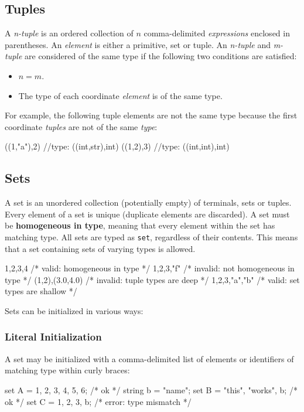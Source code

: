 \subsection{Tuples}
A \textit{n-tuple} is an ordered collection of $n$ comma-delimited \textit{expressions} enclosed in parentheses.  An 		\textit{element} is either a primitive, set or tuple.  An \textit{n-tuple} and \textit{m-tuple} are considered of the 			same type if the following two conditions are satisfied:
		\begin{itemize}
		\item $n = m$.
		\item The type of each coordinate \textit{element} is of the same type.
		\end{itemize}
	For example, the following tuple elements are not the same type because the first coordinate \textit{tuples} are not of the same \textit{type}:
	
\begin{code}
((1,"a"),2) //type: ((int,str),int)
((1,2),3) //type: ((int,int),int)
\end{code}
	
\subsection{Sets}
A set is an unordered collection (potentially empty) of terminals, sets or tuples.  Every element of a set is unique (duplicate elements are discarded).  A set must be \textbf{homogeneous in type}, meaning that every element within the set has matching type.  All sets are typed as \verb|set|, regardless of their contents.  This means that a set containing sets of varying types is allowed.  

\begin{code}
{1,2,3,4} /* valid: homogeneous in type */
{1,2,3,"f"} /* invalid: not homogeneous in type */
{(1,2),(3.0,4.0)} /* invalid: tuple types are deep */
{{1,2,3},{"a","b"}} /* valid: set types are shallow */
\end{code}

Sets can be initialized in various ways:
	\subsubsection{Literal Initialization}
	A set may be initialized with a comma-delimited list of elements or identifiers of matching type within curly braces:
	
\begin{code}	
set A = {1, 2, 3, 4, 5, 6}; /* ok */
string b = "name";
set B = {"this", "works", b}; /* ok */
set C = {1, 2, 3, b}; /* error: type mismatch */
\end{code}

